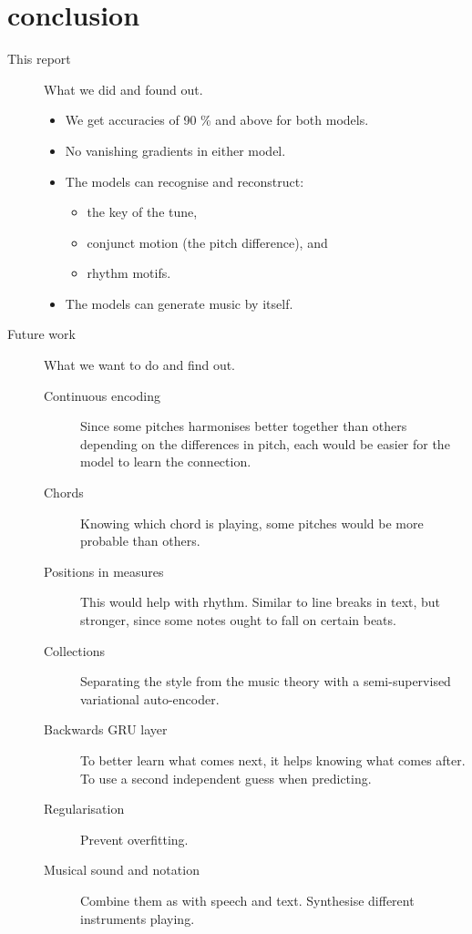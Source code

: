 \section{conclusion}
\label{sec:conclusion}

\begin{description}
	\item[This report] What we did and found out.
	
	\begin{itemize}
		\item We get accuracies of 90 \% and above for both models.
		\item No vanishing gradients in either model.
		\item The models can recognise and reconstruct:
		\begin{itemize}
			\item the key of the tune,
			\item conjunct motion (the pitch difference), and
			\item rhythm motifs.
		\end{itemize}
		\item The models can generate music by itself.
	\end{itemize}
	
	\item[Future work] What we want to do and find out.
	
	\begin{description}
		\item[Continuous encoding] Since some pitches harmonises better together than others depending on the differences in pitch, each would be easier for the model to learn the connection.
		\item[Chords] Knowing which chord is playing, some pitches would be more probable than others.
		\item[Positions in measures] This would help with rhythm. Similar to line breaks in text, but stronger, since some notes ought to fall on certain beats.
		\item[Collections] Separating the style from the music theory with a semi-supervised variational auto-encoder.
		\item[Backwards GRU layer] To better learn what comes next, it helps knowing what comes after. To use a second independent guess when predicting.
		\item[Regularisation] Prevent overfitting.
		\item[Musical sound and notation] Combine them as with speech and text. Synthesise different instruments playing.
	\end{description}
\end{description}
